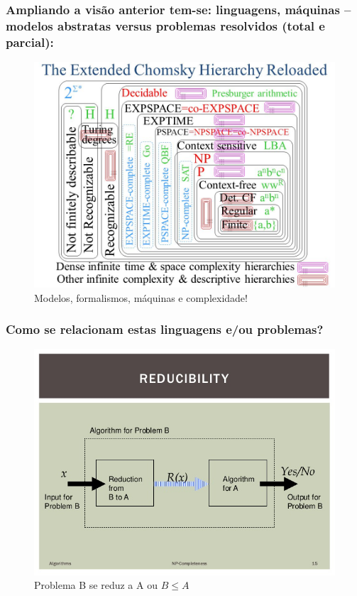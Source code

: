 \documentclass[10pt]{beamer}
\begin{document}
\begin{frame}[fragile]

\frametitle{Ampliando a visão anterior tem-se: linguagens, máquinas -- modelos abstratas  versus problemas resolvidos (total e parcial): }

\begin{figure}[!ht]
\centering
\includegraphics[height =.65\textheight,width=.8\textwidth]
{figuras/Extended+Chomsky+Hierarchy.jpg}
\caption{Modelos, formalismos, máquinas e complexidade!}
\end{figure}

\end{frame}



\begin{frame}[fragile]
\frametitle{Como se relacionam estas linguagens e/ou problemas?}
\begin{figure}[!ht]
	\centering
	\includegraphics[height =.7\textheight,width=.8\textwidth]
	{figuras/reducao01.jpg}
	\caption{Problema B se reduz a A ou $ B \le A$}
\end{figure}

\end{frame}
\end{document}
